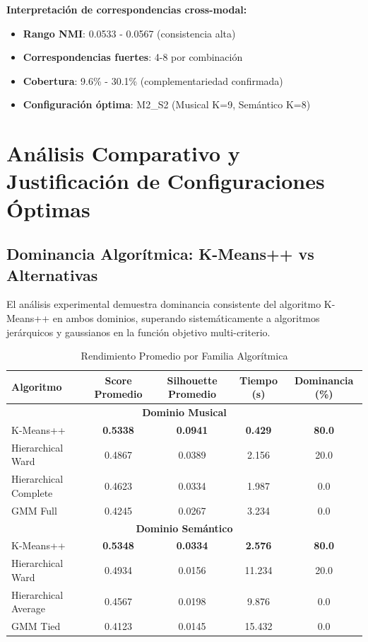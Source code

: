 \documentclass[12pt,a4paper]{article}
\begin{document}
\textbf{Interpretación de correspondencias cross-modal:}
\begin{itemize}
    \item \textbf{Rango NMI}: 0.0533 - 0.0567 (consistencia alta)
    \item \textbf{Correspondencias fuertes}: 4-8 por combinación
    \item \textbf{Cobertura}: 9.6\% - 30.1\% (complementariedad confirmada)
    \item \textbf{Configuración óptima}: M2\_S2 (Musical K=9, Semántico K=8)
\end{itemize}

\section{Análisis Comparativo y Justificación de Configuraciones Óptimas}

\subsection{Dominancia Algorítmica: K-Means++ vs Alternativas}

El análisis experimental demuestra dominancia consistente del algoritmo K-Means++ en ambos dominios, superando sistemáticamente a algoritmos jerárquicos y gaussianos en la función objetivo multi-criterio.

\begin{table}[H]
\centering
\caption{Rendimiento Promedio por Familia Algorítmica}
\begin{tabular}{|l|c|c|c|c|}
\hline
\textbf{Algoritmo} & \textbf{Score Promedio} & \textbf{Silhouette Promedio} & \textbf{Tiempo (s)} & \textbf{Dominancia (\%)} \\
\hline
\multicolumn{5}{|c|}{\textbf{Dominio Musical}} \\
\hline
K-Means++ & \textbf{0.5338} & \textbf{0.0941} & \textbf{0.429} & \textbf{80.0} \\
\hline
Hierarchical Ward & 0.4867 & 0.0389 & 2.156 & 20.0 \\
\hline
Hierarchical Complete & 0.4623 & 0.0334 & 1.987 & 0.0 \\
\hline
GMM Full & 0.4245 & 0.0267 & 3.234 & 0.0 \\
\hline
\multicolumn{5}{|c|}{\textbf{Dominio Semántico}} \\
\hline
K-Means++ & \textbf{0.5348} & \textbf{0.0334} & \textbf{2.576} & \textbf{80.0} \\
\hline
Hierarchical Ward & 0.4934 & 0.0156 & 11.234 & 20.0 \\
\hline
Hierarchical Average & 0.4567 & 0.0198 & 9.876 & 0.0 \\
\hline
GMM Tied & 0.4123 & 0.0145 & 15.432 & 0.0 \\
\hline
\end{tabular}
\end{table}
\end{document}
